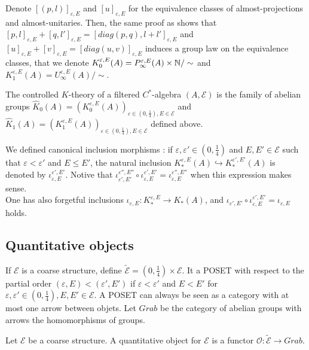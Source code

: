 Denote $[(p,l)]_{\varepsilon,E}$ and $[u]_{\varepsilon,E}$ for the equivalence classes of almost-projections and almost-unitaries. Then, the same proof as \cite{OY2} shows that $[p,l]_{\varepsilon,E}+[q,l']_{\varepsilon,E}=[diag(p,q),l+l']_{\varepsilon,E}$ and $[u]_{\varepsilon,E}+[v]_{\varepsilon,E}=[diag(u,v)]_{\varepsilon,E}$ induces a group law on the equivalence classes, that we denote $K_0^{\varepsilon,E}(A) = P^{\varepsilon, E}_\infty(A)\times \mathbb N / \sim$ and $K_1^{\varepsilon,E}(A) = U^{\varepsilon, E}_\infty(A) / \sim$.\\

\begin{definition}
The controlled $K$-theory of a filtered $C^*$-algebra $(A,\mathcal E)$ is the family of abelian groups $\hat K_0(A) = (K_0^{\varepsilon,E}(A))_{\varepsilon\in (0,\frac{1}{4}),E\in\mathcal E}$ and $\hat K_1(A) = (K_1^{\varepsilon,E}(A))_{\varepsilon\in (0,\frac{1}{4}),E\in\mathcal E}$ defined above.\\
\end{definition}

We defined canonical inclusion morphisms : if $\varepsilon, \varepsilon'\in (0,\frac{1}{4})$ and $E,E'\in\mathcal E$ such that $\varepsilon < \varepsilon'$ and $E \leq E'$, the natural inclusion $K_*^{\varepsilon,E}(A)\hookrightarrow K_*^{\varepsilon',E'}(A)$ is denoted by $\iota_{\varepsilon,E}^{\varepsilon',E'}$. Notive that $\iota_{\varepsilon',E'}^{\varepsilon'',E''}\circ\iota_{\varepsilon,E}^{\varepsilon',E'}=\iota_{\varepsilon,E}^{\varepsilon'',E''}$ when this expression makes sense.\\

One has also forgetful inclusions $\iota_{\varepsilon,E} : K_*^{\varepsilon,E}\rightarrow K_*(A)$, and 
$\iota_{\varepsilon',E'}\circ\iota_{\varepsilon,E}^{\varepsilon',E'}=\iota_{\varepsilon, E}$ holds.\\

\subsection{Quantitative objects}

If $\mathcal E$ is a coarse structure, define $\mathcal{\tilde E} = (0,\frac{1}{4})\times \mathcal E$. It a POSET with respect to the partial order $(\varepsilon,E)<(\varepsilon', E')$ if $\varepsilon<\varepsilon'$ and $E<E'$ for $\varepsilon,\varepsilon'\in (0,\frac{1}{4}),E,E'\in\mathcal E$. A POSET can always be seen as a category with at most one arrow between objets. Let $Grab$ be the category of abelian groups with arrows the homomorphisms of groups.
\begin{definition}
Let $\mathcal E$ be a coarse structure. A quantitative object for $\mathcal E$ is a functor $\mathcal O :  \mathcal{\tilde E} \rightarrow Grab$.
\end{definition}

